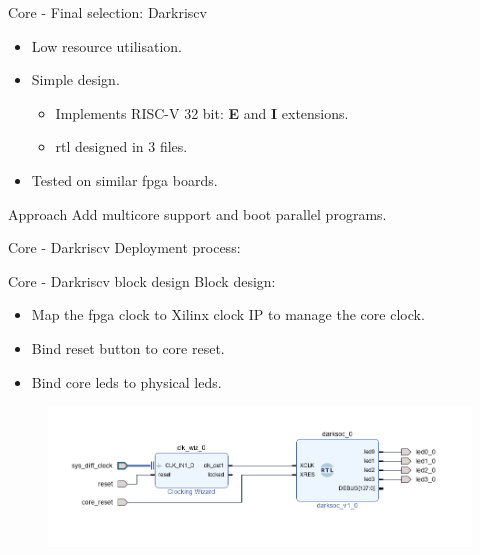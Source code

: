 \begin{frame}{Core - Final selection: Darkriscv}
  \begin{itemize}
    \item Low resource utilisation.
    \item Simple design.
    \begin{itemize}
      \item Implements RISC-V 32 bit: \textbf{E} and \textbf{I} extensions.
      \item \gls{rtl} designed in 3 files. 
    \end{itemize}
    \item Tested on similar \gls{fpga} boards.
  \end{itemize}
  \begin{exampleblock}{Approach}
    Add multicore support and boot parallel programs.
  \end{exampleblock}
\end{frame}

\begin{frame}{Core - Darkriscv}
  Deployment process:
 \begin{center}
  \end{center}
\end{frame}

\begin{frame}{Core - Darkriscv block design}
  Block design:
  \begin{itemize}
    \item Map the \gls{fpga} clock to Xilinx clock IP to manage the core clock.
    \item Bind reset button to core reset.
    \item Bind core leds to physical leds.
  \end{itemize}
 \begin{center}
\begin{figure}[!ht]
    \includegraphics[width=1\linewidth]{images/block-design.png}
\end{figure}
  \end{center}
\end{frame}